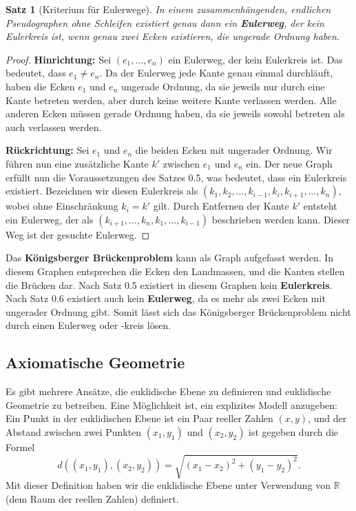 \documentclass[a4paper,12pt]{article}
\theoremstyle{break}
\newtheorem{theorem}[definition]{Satz}
\newcommand{\R}{\mathbb{R}}
\begin{document}
\begin{theorem}[Kriterium für Eulerwege]
In einem zusammenhängenden, endlichen Pseudographen ohne Schleifen existiert genau dann ein \textbf{Eulerweg}, der kein Eulerkreis ist, wenn genau zwei Ecken existieren, die ungerade Ordnung haben.
\end{theorem}

\begin{proof}
\textbf{Hinrichtung:} Sei \( (e_1, \dots, e_n) \) ein Eulerweg, der kein Eulerkreis ist. Das bedeutet, dass \( e_1 \neq e_n \). Da der Eulerweg jede Kante genau einmal durchläuft, haben die Ecken \( e_1 \) und \( e_n \) ungerade Ordnung, da sie jeweils nur durch eine Kante betreten werden, aber durch keine weitere Kante verlassen werden. Alle anderen Ecken müssen gerade Ordnung haben, da sie jeweils sowohl betreten als auch verlassen werden.

\textbf{Rückrichtung:} Sei \( e_1 \) und \( e_n \) die beiden Ecken mit ungerader Ordnung. Wir führen nun eine zusätzliche Kante \( k' \) zwischen \( e_1 \) und \( e_n \) ein. Der neue Graph erfüllt nun die Voraussetzungen des Satzes 0.5, was bedeutet, dass ein Eulerkreis existiert. Bezeichnen wir diesen Eulerkreis als \( (k_1, k_2, \dots, k_{i-1}, k_i, k_{i+1}, \dots, k_n) \), wobei ohne Einschränkung \( k_i = k' \) gilt. Durch Entfernen der Kante \( k' \) entsteht ein Eulerweg, der als \( (k_{i+1}, \dots, k_n, k_1, \dots, k_{i-1}) \) beschrieben werden kann. Dieser Weg ist der gesuchte Eulerweg.
\end{proof}

Das \textbf{Königsberger Brückenproblem} kann als Graph aufgefasst werden. In diesem Graphen entsprechen die Ecken den Landmassen, und die Kanten stellen die Brücken dar. Nach Satz 0.5 existiert in diesem Graphen kein \textbf{Eulerkreis}. Nach Satz 0.6 existiert auch kein \textbf{Eulerweg}, da es mehr als zwei Ecken mit ungerader Ordnung gibt. Somit lässt sich das Königsberger Brückenproblem nicht durch einen Eulerweg oder -kreis lösen.
\subsection{Axiomatische Geometrie}

Es gibt mehrere Ansätze, die euklidische Ebene zu definieren und euklidische Geometrie zu betreiben. Eine Möglichkeit ist, ein explizites Modell anzugeben: Ein Punkt in der euklidischen Ebene ist ein Paar reeller Zahlen \( (x, y) \), und der Abstand zwischen zwei Punkten \( (x_1, y_1) \) und \( (x_2, y_2) \) ist gegeben durch die Formel
\[
d\left( (x_1, y_1), (x_2, y_2) \right) = \sqrt{(x_1 - x_2)^2 + (y_1 - y_2)^2}.
\]
Mit dieser Definition haben wir die euklidische Ebene unter Verwendung von \( \R \) (dem Raum der reellen Zahlen) definiert.
\end{document}
